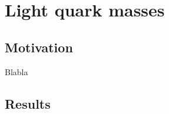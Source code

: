 \chapter{Light quark masses}%


\label{ch_qm}


\section{Motivation}
\label{ch_qm:sec:introduction}

Blabla


\section{Results}
\label{ch_qm:sec:Results}


